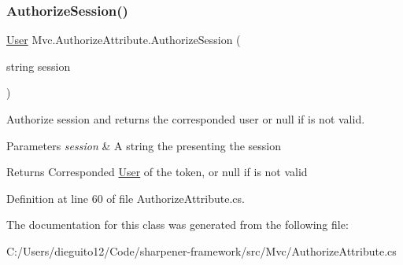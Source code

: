 \subsubsection{\texorpdfstring{Authorize\+Session()}{AuthorizeSession()}}
{\footnotesize\ttfamily \hyperlink{class_mvc_1_1_user}{User} Mvc.\+Authorize\+Attribute.\+Authorize\+Session (\begin{DoxyParamCaption}\item[{string}]{session }\end{DoxyParamCaption})}



Authorize session and returns the corresponded user or null if is not valid. 


\begin{DoxyParams}{Parameters}
{\em session} & A string the presenting the session\\
\hline
\end{DoxyParams}
\begin{DoxyReturn}{Returns}
Corresponded \hyperlink{class_mvc_1_1_user}{User} of the token, or null if is not valid
\end{DoxyReturn}


Definition at line 60 of file Authorize\+Attribute.\+cs.



The documentation for this class was generated from the following file\+:\begin{DoxyCompactItemize}
\item 
C\+:/\+Users/dieguito12/\+Code/sharpener-\/framework/src/\+Mvc/Authorize\+Attribute.\+cs\end{DoxyCompactItemize}
